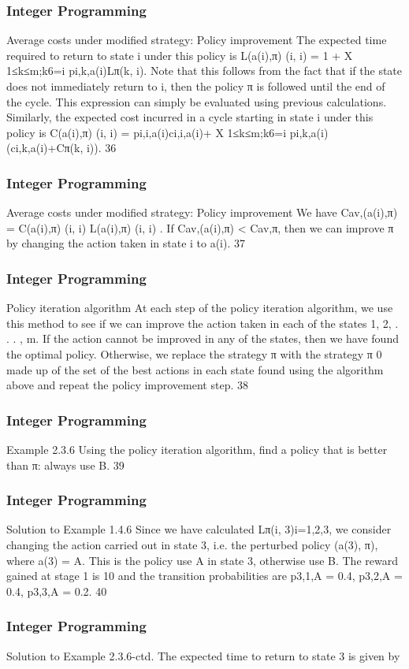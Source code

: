\begin{frame} 
\frametitle{Integer Programming}     
Average costs under modified strategy: Policy
improvement
The expected time required to return to state i under this policy is
L(a(i),π)
(i, i) = 1 + X
1≤k≤m;k6=i
pi,k,a(i)Lπ(k, i).
Note that this follows from the fact that if the state does not
immediately return to i, then the policy π is followed until the end
of the cycle.
This expression can simply be evaluated using previous calculations.
Similarly, the expected cost incurred in a cycle starting in state i
under this policy is
C(a(i),π)
(i, i) = pi,i,a(i)ci,i,a(i)+
X
1≤k≤m;k6=i
pi,k,a(i)
(ci,k,a(i)+Cπ(k, i)).
36 \end{frame}  \begin{frame} \frametitle{Integer Programming}     
Average costs under modified strategy: Policy
improvement
We have
Cav,(a(i),π) =
C(a(i),π)
(i, i)
L(a(i),π)
(i, i)
.
If Cav,(a(i),π) < Cav,π, then we can improve π by changing the
action taken in state i to a(i).
37 \end{frame}  \begin{frame} \frametitle{Integer Programming}     
Policy iteration algorithm
At each step of the policy iteration algorithm, we use this method
to see if we can improve the action taken in each of the states
1, 2, . . . , m.
If the action cannot be improved in any of the states, then we have
found the optimal policy.
Otherwise, we replace the strategy π with the strategy π
0 made up
of the set of the best actions in each state found using the
algorithm above and repeat the policy improvement step.
38 \end{frame}  \begin{frame} \frametitle{Integer Programming}     
Example 2.3.6
Using the policy iteration algorithm, find a policy that is better
than π: always use B.
39 \end{frame}  \begin{frame} \frametitle{Integer Programming}     
Solution to Example 1.4.6
Since we have calculated {Lπ(i, 3)}i=1,2,3, we consider changing
the action carried out in state 3, i.e. the perturbed policy
(a(3), π), where a(3) = A. This is the policy use A in state 3,
otherwise use B.
The reward gained at stage 1 is 10 and the transition probabilities
are p3,1,A = 0.4, p3,2,A = 0.4, p3,3,A = 0.2.
40 \end{frame}  \begin{frame} \frametitle{Integer Programming}     
Solution to Example 2.3.6-ctd.
The expected time to return to state 3 is given by

\end{frame}

